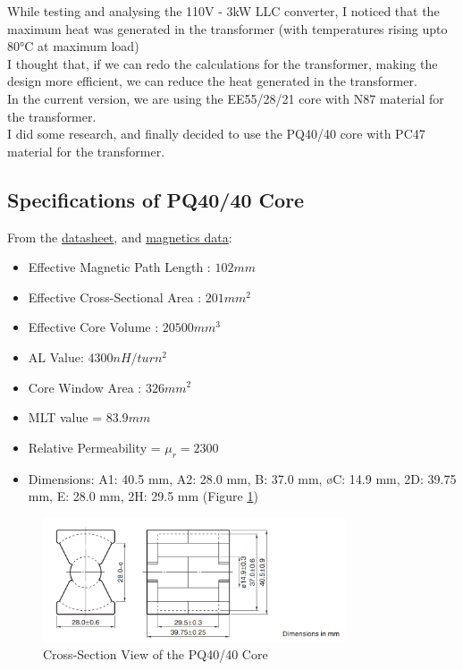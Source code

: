 While testing and analysing the 110V - 3kW LLC converter, I noticed that the maximum heat was generated in the transformer (with temperatures rising upto 80°C at maximum load)\\
I thought that, if we can redo the calculations for the transformer, making the design more efficient, we can reduce the heat generated in the transformer.\\
In the current version, we are using the EE55/28/21 core with N87 material for the transformer.\\
I did some research, and finally decided to use the PQ40/40 core with PC47 material for the transformer.
\subsection{Specifications of PQ40/40 Core}
From the \href{https://product.tdk.com/en/search/ferrite/ferrite/ferrite-core/info?part_no=PC47PQ40/40Z-12}{datasheet}, and \href{https://web.eecs.utk.edu/~dcostine/ECE482/Spring2014/materials/magnetics/MagneticsTables.pdf}{magnetics data}:
\begin{itemize}
    \item Effective Magnetic Path Length : $102 mm$
    \item Effective Cross-Sectional Area : $201 mm^2$
    \item Effective Core Volume : $20500 mm^3$
    \item AL Value: $4300 nH/turn^2$
    \item Core Window Area : $326 mm^2$
    \item MLT value = $83.9mm$
    \item Relative Permeability = $\mu_r = 2300$
    \item Dimensions: A1: 40.5 mm, A2: 28.0 mm, B: 37.0 mm, øC: 14.9 mm, 2D: 39.75 mm, E: 28.0 mm, 2H: 29.5 mm (Figure \ref*{fig:image3})
\end{itemize}
\begin{figure}[H]
    \centering
    \includegraphics[width=0.8\textwidth]{images/image3.png}
    \caption{Cross-Section View of the PQ40/40 Core}
    \label{fig:image3}
\end{figure}

